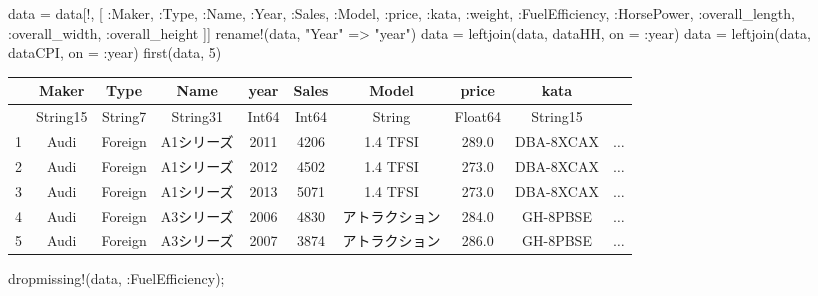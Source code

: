 \documentclass[
  letterpaper,
  DIV=11,
  numbers=noendperiod]{scrreprt}
\newenvironment{Shaded}{\begin{snugshade}}{\end{snugshade}}
\newcommand{\DataTypeTok}[1]{\textcolor[rgb]{0.68,0.00,0.00}{#1}}
\newcommand{\FloatTok}[1]{\textcolor[rgb]{0.68,0.00,0.00}{#1}}
\newcommand{\FunctionTok}[1]{\textcolor[rgb]{0.28,0.35,0.67}{#1}}
\newcommand{\NormalTok}[1]{\textcolor[rgb]{0.00,0.23,0.31}{#1}}
\newcommand{\OperatorTok}[1]{\textcolor[rgb]{0.37,0.37,0.37}{#1}}
\newcommand{\StringTok}[1]{\textcolor[rgb]{0.13,0.47,0.30}{#1}}
\begin{document}
\begin{Shaded}
\begin{Highlighting}[]
\NormalTok{data }\OperatorTok{=}\NormalTok{ data[!, [}
        \OperatorTok{:}\NormalTok{Maker, }\OperatorTok{:}\DataTypeTok{Type}\NormalTok{, }\OperatorTok{:}\NormalTok{Name, }\OperatorTok{:}\NormalTok{Year, }\OperatorTok{:}\NormalTok{Sales, }
        \OperatorTok{:}\NormalTok{Model, }\OperatorTok{:}\NormalTok{price, }\OperatorTok{:}\NormalTok{kata, }\OperatorTok{:}\NormalTok{weight, }\OperatorTok{:}\NormalTok{FuelEfficiency, }
        \OperatorTok{:}\NormalTok{HorsePower, }\OperatorTok{:}\NormalTok{overall\_length, }\OperatorTok{:}\NormalTok{overall\_width, }\OperatorTok{:}\NormalTok{overall\_height}
\NormalTok{        ]]}
\FunctionTok{rename!}\NormalTok{(data, }\StringTok{"Year"} \OperatorTok{=\textgreater{}} \StringTok{"year"}\NormalTok{)}
\NormalTok{data }\OperatorTok{=} \FunctionTok{leftjoin}\NormalTok{(data, dataHH, on }\OperatorTok{=} \OperatorTok{:}\NormalTok{year)}
\NormalTok{data }\OperatorTok{=} \FunctionTok{leftjoin}\NormalTok{(data, dataCPI, on }\OperatorTok{=} \OperatorTok{:}\NormalTok{year)}
\FunctionTok{first}\NormalTok{(data, }\FloatTok{5}\NormalTok{)}
\end{Highlighting}
\end{Shaded}

\begin{tabular}{r|ccccccccc}
    & Maker & Type & Name & year & Sales & Model & price & kata & \\
    \hline
    & String15 & String7 & String31 & Int64 & Int64 & String & Float64 & String15 & \\
    \hline
    1 & Audi & Foreign & A1シリーズ & 2011 & 4206 & 1.4 TFSI & 289.0 & DBA-8XCAX & $\dots$ \\
    2 & Audi & Foreign & A1シリーズ & 2012 & 4502 & 1.4 TFSI & 273.0 & DBA-8XCAX & $\dots$ \\
    3 & Audi & Foreign & A1シリーズ & 2013 & 5071 & 1.4 TFSI & 273.0 & DBA-8XCAX & $\dots$ \\
    4 & Audi & Foreign & A3シリーズ & 2006 & 4830 & アトラクション & 284.0 & GH-8PBSE & $\dots$ \\
    5 & Audi & Foreign & A3シリーズ & 2007 & 3874 & アトラクション & 286.0 & GH-8PBSE & $\dots$ \\
\end{tabular}

\begin{Shaded}
\begin{Highlighting}[]
\FunctionTok{dropmissing!}\NormalTok{(data, }\OperatorTok{:}\NormalTok{FuelEfficiency);}
\end{Highlighting}
\end{Shaded}
\end{document}
